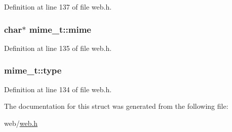 Definition at line 137 of file web.\+h.

\subsubsection[{\texorpdfstring{mime}{mime}}]{\setlength{\rightskip}{0pt plus 5cm}char$\ast$ mime\+\_\+t\+::mime}\hypertarget{structmime__t_ad796d16eaee60d7435bff66b2e9b8a8d}{}\label{structmime__t_ad796d16eaee60d7435bff66b2e9b8a8d}


Definition at line 135 of file web.\+h.

\subsubsection[{\texorpdfstring{type}{type}}]{ mime\+\_\+t\+::type}\hypertarget{structmime__t_ae69826dcfd475d65fa0fe8a1574bb3af}{}\label{structmime__t_ae69826dcfd475d65fa0fe8a1574bb3af}


Definition at line 134 of file web.\+h.



The documentation for this struct was generated from the following file\+:\begin{DoxyCompactItemize}
\item 
web/\hyperlink{web_8h}{web.\+h}\end{DoxyCompactItemize}
